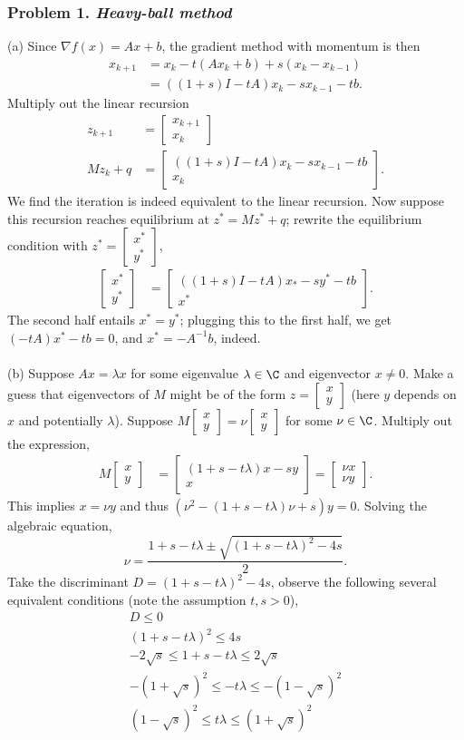 \documentclass[12pt,a4paper]{article}
\renewcommand{\l}{\left}\renewcommand{\r}{\right}
\newcommand{\ttm}[4]{\l[\begin{array}{cc}{#1}&{#2}\\{#3}&{#4}\end{array}\r]} %
\newcommand{\tv}[2]{\l[\begin{array}{c}{#1}\\{#2}\end{array}\r]}
\newcommand{\kp}[1]{{k+{#1}}}
\newcommand{\km}[1]{{k-{#1}}}
\begin{document}
\subsubsection*{Problem 1. \textit{Heavy-ball method}}
(a) Since $\nabla f(x) = Ax + b$, the gradient method with momentum is then
\begin{align*}
  x_\kp1 & = x_k - t(Ax_k + b) + s(x_k - x_\km1) \\
         & = ((1+s)I - tA) x_k - sx_\km1 - tb.
\end{align*}
Multiply out the linear recursion
\begin{align*}
  z_\kp1   & = \tv{x_\kp1}{x_k} \\
  Mz_k + q %
           & = \tv{((1+s)I - tA) x_k - sx_\km1 - tb}{x_k}.
\end{align*}
We find the iteration is indeed equivalent to the linear recursion. 
Now suppose this recursion reaches equilibrium at $z^\ast = Mz^\ast + q$; 
rewrite the equilibrium condition with $z^\ast = \tv{x^\ast}{y^\ast}$,
\begin{align*}
  \tv{x^\ast}{y^\ast} & = \tv{((1+s)I - tA) x_\ast - sy^\ast - tb}{x^\ast}.
\end{align*}
The second half entails $x^\ast = y^\ast$; 
plugging this to the first half, we get $(-tA)x^\ast - tb = 0$, and $x^\ast = -A^{-1}b$, indeed. \\
\\
(b) Suppose $Ax = \lambda x$ for some eigenvalue $\lambda \in \C$ and eigenvector $x \neq 0$. 
Make a guess that eigenvectors of $M$ might be of the form $z = \tv{x}{y}$ (here $y$ depends on $x$ and potentially $\lambda$). 
Suppose $M\tv{x}{y} = \nu\tv{x}{y}$ for some $\nu \in \C$. 
Multiply out the expression,
\begin{align*}
  M\tv x y &= \tv { (1+s-t\lambda)x - sy } {x} = \tv{\nu x}{\nu y}.
\end{align*}
This implies $x = \nu y$ and thus $(\nu^2 - (1+s-t\lambda) \nu + s) y = 0$.
Solving the algebraic equation, 
$$ \nu = \frac{1+s-t\lambda \pm \sqrt{(1+s-t\lambda)^2 - 4s}}2.$$
Take the discriminant $D = (1+s-t\lambda)^2 - 4s$, observe the following several equivalent conditions (note the assumption $t, s > 0$),
\begin{gather}
  D                \leq 0  \\
  (1+s-t\lambda)^2 \leq 4s \\
  - 2\sqrt s \leq 1+s-t\lambda \leq 2\sqrt s \\
  -(1+\sqrt s)^2 \leq -t\lambda \leq -(1-\sqrt s)^2\\
  (1-\sqrt s)^2 \leq t\lambda \leq (1+\sqrt s)^2 \label{5}
\end{gather}
\end{document}
